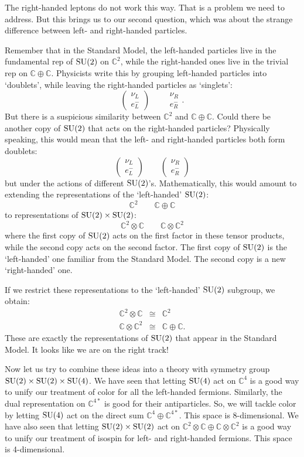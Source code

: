\documentclass{article}
\newcommand{\C}{{\mathbb C}}  %
\newcommand{\SU}{{\rm SU}}    %
\newcommand{\iso}{\cong} %
\newcommand{\lep}{\left( \! \begin{array}{c} \nu_L \\ e^-_L \end{array} \! \right)} %
\begin{document}
The right-handed leptons do not work this way.  That is a problem
we need to address.  But this brings us to our second question, 
which was about the strange difference between left- and right-handed 
particles. 

Remember that in the Standard Model, the left-handed particles live 
in the fundamental rep of $\SU(2)$ on $\C^2$, while the right-handed 
ones live in the trivial rep on $\C \oplus \C$. Physicists write this 
by grouping left-handed particles into `doublets', while leaving the
right-handed particles as `singlets':
\[ \lep \quad \quad 
\begin{array}{c}
	\nu_R \\
	e^-_R 
\end{array}.
\]
But there is a suspicious similarity between $\C^2$ and $\C \oplus \C$. Could
there be another copy of $\SU(2)$ that acts on the right-handed particles?
Physically speaking, this would mean that the left- and right-handed particles 
both form doublets:
\[ \lep \quad \quad 
\left( \!
\begin{array}{c}
	\nu_R \\
	e^-_R
\end{array}
\! \right)
\]
but under the actions of different $\SU(2)$'s.  Mathematically, this 
would amount to extending the representations of the `left-handed' $\SU(2)$:
\[ \C^2 \quad \quad \C \oplus \C \]
to representations of $\SU(2) \times \SU(2)$:
\[ \C^2 \otimes \C \quad \quad \C \otimes \C^2 \]
where the first copy of $\SU(2)$ acts on
the first factor in these tensor products, while the second copy acts on
the second factor.  The first copy of $\SU(2)$ is the `left-handed'
one familiar from the Standard Model.  The second copy is a new
`right-handed' one.

If we restrict these representations to the `left-handed' $\SU(2)$
subgroup, we obtain:
\begin{eqnarray*} 
	\C^2 \otimes \C & \iso & \C^2 \\ 
	\C \otimes \C^2 & \iso & \C \oplus \C .
\end{eqnarray*}
These are exactly the representations of $\SU(2)$ that appear in 
the Standard Model. It looks like we are on the right track!

Now let us try to combine these ideas into a theory with symmetry group 
$\SU(2) \times \SU(2) \times \SU(4)$.   We have seen that letting 
$\SU(4)$ act on $\C^4$ is a good way to unify our treatment
of color for all the left-handed fermions.  Similarly, the dual representation 
on $\C^{4*}$ is good for their antiparticles.   So, we will tackle color
by letting $\SU(4)$ act on the direct sum $\C^4 \oplus \C^{4*}$.   This 
space is 8-dimensional.  We have also seen that letting $\SU(2) \times \SU(2)$ 
act on $\C^2 \otimes \C \oplus \C \otimes \C^2$ is a good way to unify our 
treatment of isospin for left- and right-handed fermions.  This space is 
4-dimensional. 
\end{document}

